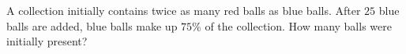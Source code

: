 A collection initially contains twice as many red balls as blue balls. After $25$ blue balls are added, blue balls make up $75\%$ of the collection. How many balls were initially present?
